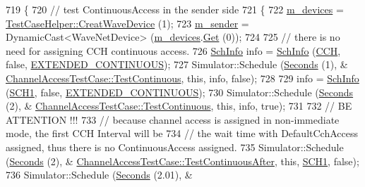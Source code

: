 \begin{DoxyCode}
719 \{
720   \textcolor{comment}{// test ContinuousAccess in the sender side}
721   \{
722     \hyperlink{classChannelAccessTestCase_a36ad5644e4eb713b912aed42eb3fe4dc}{m\_devices} = \hyperlink{classTestCaseHelper_a24337801fa036883111fa1968606b57e}{TestCaseHelper::CreatWaveDevice} (1);
723     \hyperlink{classChannelAccessTestCase_af2ed348403976d1e39d0099313ed3680}{m\_sender} = DynamicCast<WaveNetDevice> (\hyperlink{classChannelAccessTestCase_a36ad5644e4eb713b912aed42eb3fe4dc}{m\_devices}.\hyperlink{classns3_1_1NetDeviceContainer_a677d62594b5c9d2dea155cc5045f4d0b}{Get} (0));
724 
725     \textcolor{comment}{// there is no need for assigning CCH continuous access.}
726     \hyperlink{structns3_1_1SchInfo}{SchInfo} info = \hyperlink{structns3_1_1SchInfo}{SchInfo} (\hyperlink{channel-manager_8h_a52d2f169cde2f6abe66ecc83f0d7ad80}{CCH}, \textcolor{keyword}{false}, \hyperlink{channel-scheduler_8h_a51fe3e802b9451e2893d55d591047fc1}{EXTENDED\_CONTINUOUS});
727     Simulator::Schedule (\hyperlink{group__timecivil_ga33c34b816f8ff6628e33d5c8e9713b9e}{Seconds} (1), &
      \hyperlink{classChannelAccessTestCase_ae5e346e49aa60f74439c2f2db2030d08}{ChannelAccessTestCase::TestContinuous}, \textcolor{keyword}{this}, info, \textcolor{keyword}{false});
728 
729     info = \hyperlink{structns3_1_1SchInfo}{SchInfo} (\hyperlink{channel-manager_8h_a456a1b730523e5d3b8a29fb227d10028}{SCH1}, \textcolor{keyword}{false}, \hyperlink{channel-scheduler_8h_a51fe3e802b9451e2893d55d591047fc1}{EXTENDED\_CONTINUOUS});
730     Simulator::Schedule (\hyperlink{group__timecivil_ga33c34b816f8ff6628e33d5c8e9713b9e}{Seconds} (2), &
      \hyperlink{classChannelAccessTestCase_ae5e346e49aa60f74439c2f2db2030d08}{ChannelAccessTestCase::TestContinuous}, \textcolor{keyword}{this}, info, \textcolor{keyword}{true});
731 
732     \textcolor{comment}{// BE ATTENTION !!!}
733     \textcolor{comment}{// because channel access is assigned in non-immediate mode, the first CCH Interval will be}
734     \textcolor{comment}{// the wait time with DefaultCchAccess assigned, thus there is no ContinuousAccess assigned.}
735     Simulator::Schedule (\hyperlink{group__timecivil_ga33c34b816f8ff6628e33d5c8e9713b9e}{Seconds} (2), &
      \hyperlink{classChannelAccessTestCase_ab9dcdeeb2318a3a44a4a2680ade3a6e1}{ChannelAccessTestCase::TestContinuousAfter}, \textcolor{keyword}{this}, 
      \hyperlink{channel-manager_8h_a456a1b730523e5d3b8a29fb227d10028}{SCH1}, \textcolor{keyword}{false});
736     Simulator::Schedule (\hyperlink{group__timecivil_ga33c34b816f8ff6628e33d5c8e9713b9e}{Seconds} (2.01), &

\end{DoxyCode}
